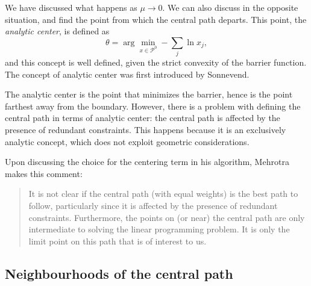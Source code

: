 We have discussed what happens as $\mu \to 0$. We can also discuss in
the opposite situation, and find the point from which the central path
departs.
This point, the {\em analytic center}, is defined as
\[
\theta = \arg \min_{x \in \mathcal{P}^0} -\sum_j \ln x_j,
\]
and this concept is well defined, given the strict convexity of the 
barrier function. The concept of analytic center was first 
introduced by Sonnevend.

The analytic center is the point that minimizes the barrier, hence
is the point farthest away from the boundary.
However, there is a problem with defining the central path in terms
of analytic center: the central path is affected by the presence of 
redundant constraints. 
This happens because it is an exclusively analytic concept, which does
not exploit geometric considerations.





Upon discussing the choice for the centering term in his algorithm,
Mehrotra \cite{Mehrotra92} makes this comment:
\begin{quote}
It is not clear if the central path (with
equal weights) is the best path to follow, particularly since it
is affected by the presence of redundant constraints. Furthermore,
the points on (or near) the central path are only intermediate to
solving the linear programming problem. It is only the limit point 
on this path that is of interest to us.
\end{quote}


%
%
\subsection{Neighbourhoods of the central path}
\label{sec:Neighbourhoods}

